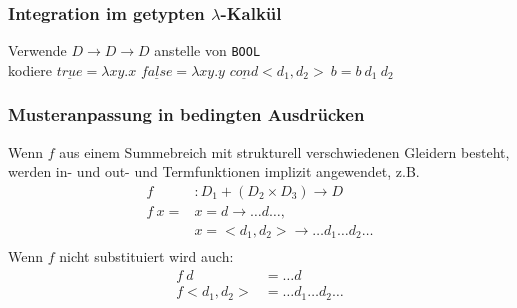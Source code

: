 \subsubsection*{Integration im getypten $\lambda$-Kalkül}
Verwende $D \rightarrow D \rightarrow D$ anstelle von \lstinline!BOOL!\\
kodiere $\underline{true} = \lambda xy.x $ $\underline{false} = \lambda xy.y$ %
$\underline{cond} <d_1, d_2> \ b = b \ d_1 \ d_2$

\subsubsection*{Musteranpassung in bedingten Ausdrücken}
Wenn $f$ aus einem Summebreich mit strukturell verschwiedenen Gleidern besteht, werden in- und out- und Termfunktionen implizit angewendet, z.B.\\
\begin{align*}
f&: D_1 + (D_2 \times D_3) \rightarrow D\\
f \ x = &x = d \rightarrow \dots d \dots, \\
& x = <d_1, d_2> \rightarrow \dots d_1 \dots d_2 \dots\\
\end{align*}
Wenn $f$ nicht substituiert wird auch: 
\begin{align*}
f \ d &= \dots d\\
f <d_1, d_2> &= \dots d_1 \dots d_2 \dots\\
\end{align*}

